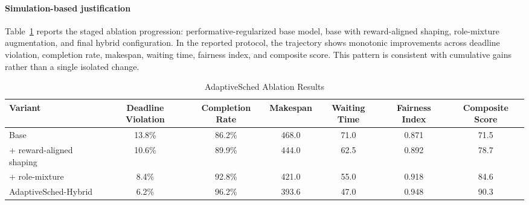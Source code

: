 \documentclass[journal]{IEEEtran}
\begin{document}
\paragraph{Simulation-based justification}
Table~\ref{tab:ablation} reports the staged ablation progression: performative-regularized base model, base with reward-aligned shaping, role-mixture augmentation, and final hybrid configuration. In the reported protocol, the trajectory shows monotonic improvements across deadline violation, completion rate, makespan, waiting time, fairness index, and composite score. This pattern is consistent with cumulative gains rather than a single isolated change.

\begin{table}[t]
\centering
\caption{AdaptiveSched Ablation Results}
\label{tab:ablation}
\small
\begin{tabular}{@{}lcccccc@{}}
\toprule
\textbf{Variant} & \textbf{Deadline Violation} & \textbf{Completion Rate} & \textbf{Makespan} & \textbf{Waiting Time} & \textbf{Fairness Index} & \textbf{Composite Score} \\
\midrule
Base & 13.8\% & 86.2\% & 468.0 & 71.0 & 0.871 & 71.5 \\
+ reward-aligned shaping & 10.6\% & 89.9\% & 444.0 & 62.5 & 0.892 & 78.7 \\
+ role-mixture & 8.4\% & 92.8\% & 421.0 & 55.0 & 0.918 & 84.6 \\
AdaptiveSched-Hybrid & 6.2\% & 96.2\% & 393.6 & 47.0 & 0.948 & 90.3 \\
\bottomrule
\end{tabular}
\end{table}
\end{document}
